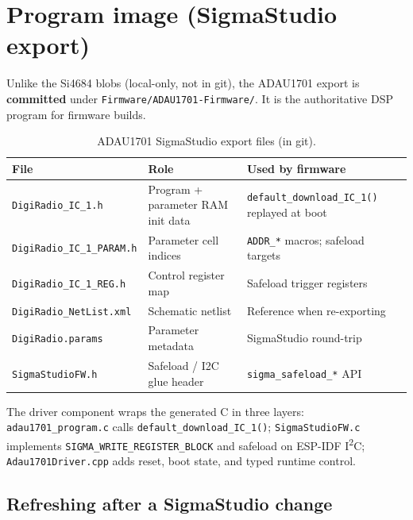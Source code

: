 \section{Program image (SigmaStudio export)}
\label{sec:adau1701-firmware}

Unlike the Si4684 blobs (local-only, not in git), the ADAU1701 export is
\textbf{committed} under \texttt{Firmware/ADAU1701-Firmware/}. It is the
authoritative DSP program for firmware builds.

\begin{table}[htbp]
  \centering
  \begin{tabular}{@{}L{3.8cm}L{3.5cm}L{6.2cm}@{}}
    \toprule
    \textbf{File} & \textbf{Role} & \textbf{Used by firmware} \\
    \midrule
    \texttt{DigiRadio\_IC\_1.h} &
      Program + parameter RAM init data &
      \texttt{default\_download\_IC\_1()} replayed at boot \\
    \texttt{DigiRadio\_IC\_1\_PARAM.h} &
      Parameter cell indices &
      \texttt{ADDR\_*} macros; safeload targets \\
    \texttt{DigiRadio\_IC\_1\_REG.h} &
      Control register map &
      Safeload trigger registers \\
    \texttt{DigiRadio\_NetList.xml} &
      Schematic netlist &
      Reference when re-exporting \\
    \texttt{DigiRadio.params} &
      Parameter metadata &
      SigmaStudio round-trip \\
    \texttt{SigmaStudioFW.h} &
      Safeload / I2C glue header &
      \texttt{sigma\_safeload\_*} API \\
    \bottomrule
  \end{tabular}
  \caption{ADAU1701 SigmaStudio export files (in git).}
  \label{tab:adau1701-files}
\end{table}

The driver component wraps the generated C in three layers:
\texttt{adau1701\_program.c} calls \texttt{default\_download\_IC\_1()};
\texttt{SigmaStudioFW.c} implements \texttt{SIGMA\_WRITE\_REGISTER\_BLOCK}
and safeload on ESP-IDF I\textsuperscript{2}C; \texttt{Adau1701Driver.cpp}
adds reset, boot state, and typed runtime control.

\subsection{Refreshing after a SigmaStudio change}
\label{sec:adau1701-refresh}

